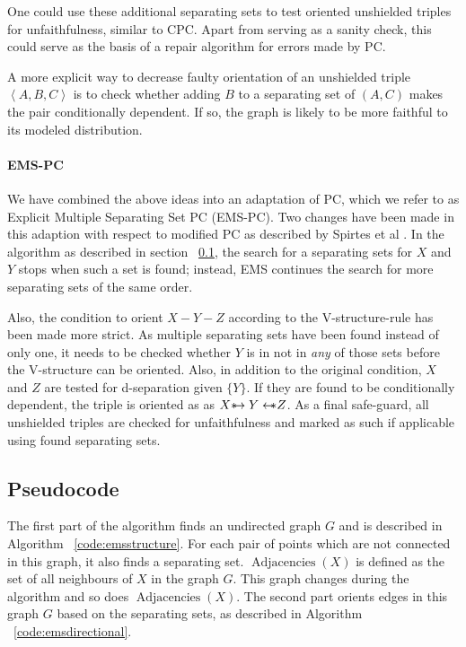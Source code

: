 \documentclass[a4paper, 10pt, english, onecolumn]{article}
\def \srightarrow {\text{\textasteriskcentered}\hspace{-0.62em}\rightarrow}
\def \sleftarrow {\leftarrow\hspace{-0.62em}\text{\textasteriskcentered}}
\begin{document}
One could use these additional separating sets to test oriented unshielded triples for unfaithfulness, similar to CPC.
Apart from serving as a sanity check, this could serve as the basis of a repair algorithm for errors made by PC.

A more explicit way to decrease faulty orientation of an unshielded triple $\left<A,B,C\right>$ is to check whether adding $B$ to a separating set of $(A,C)$ makes the pair conditionally dependent.
If so, the graph is likely to be more faithful to its modeled distribution.

\paragraph{EMS-PC}
We have combined the above ideas into an adaptation of PC, which we refer to as Explicit Multiple Separating Set PC (EMS-PC).
Two changes have been made in this adaption with respect to modified PC as described by Spirtes et al \cite{spirtes2000}.
In the algorithm as described in section ~\ref{sec:pseudocode}, the search for a separating sets for $X$ and $Y$ stops when such a set is found; instead, EMS continues the search for more separating sets of the same order.

Also, the condition to orient $X - Y - Z$ according to the V-structure-rule has been made more strict.
As multiple separating sets have been found instead of only one, it needs to be checked whether $Y$ is in not in \emph{any} of those sets before the V-structure can be oriented.
Also, in addition to the original condition, $X$ and $Z$ are tested for d-separation given $\{Y\}$.
If they are found to be conditionally dependent, the triple is oriented as as $X \srightarrow Y \sleftarrow Z$.
As a final safe-guard, all unshielded triples are checked for unfaithfulness and marked as such if applicable using found separating sets. %

\subsection{Pseudocode}
\label{sec:pseudocode}

The first part of the algorithm finds an undirected graph $G$ and is described in Algorithm ~\ref{code:emsstructure}.
For each pair of points which are not connected in this graph, it also finds a separating set. $\operatorname{Adjacencies} (X)$ is defined as the set of all neighbours of $X$ in the graph $G$.
This graph changes during the algorithm and so does $\operatorname{Adjacencies} (X)$.
The second part orients edges in this graph $G$ based on the separating sets, as described in Algorithm ~\ref{code:emsdirectional}.
\end{document}

